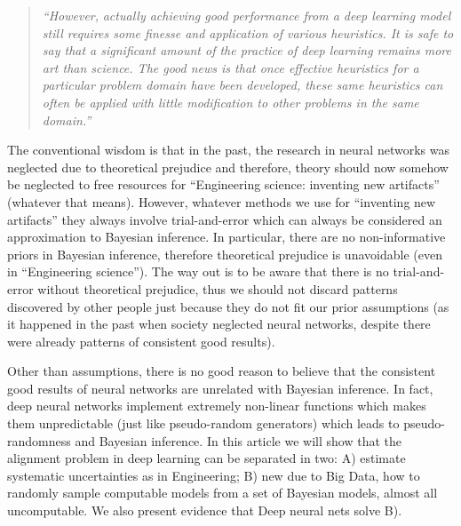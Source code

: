 \documentclass[11pt]{book}
\begin{document}
\begin{quote}
\emph{``However,} \emph{actually achieving good performance from a deep
learning model still requires some finesse and application of various
heuristics. It is safe to say that a significant amount of the practice
of deep learning remains more art than science. The good news is that
once effective heuristics for a particular problem domain have been
developed, these same heuristics can often be applied with little
modification to other problems in the same
domain.''}\cite{hermann_ab_2023}
\end{quote}

The conventional wisdom is that in the past, the research in neural
networks was neglected due to theoretical
prejudice\cite{lecun_epistemology_2019}
and therefore, theory should now somehow be neglected to free resources
for ``Engineering science: inventing new artifacts'' (whatever that
means). However, whatever methods we use for ``inventing new artifacts''
they always involve trial-and-error which can always be considered an
approximation to Bayesian inference. In particular, there are no
non-informative priors in Bayesian
inference\cite{eaton_dutch_2004}, therefore theoretical prejudice is unavoidable (even in
``Engineering science''). The way out is to be aware that there is no
trial-and-error without theoretical prejudice, thus we should not
discard patterns discovered by other people just because they do not fit
our prior assumptions (as it happened in the past when society neglected
neural networks, despite there were already patterns of consistent good
results).

Other than assumptions, there is no good reason to believe that the
consistent good results of neural networks are unrelated with Bayesian
inference. In fact, deep neural networks implement extremely non-linear
functions which makes them unpredictable (just like pseudo-random
generators) which leads to pseudo-randomness and Bayesian inference. In
this article we will show that the alignment
problem\cite{ngo_alignment_2022}\cite{wolf_fundamental_2023} in deep learning can be
separated in two: A) estimate systematic
uncertainties\cite{hullermeier_aleatoric_2021} as in Engineering; B) new due to Big Data, how to
randomly sample computable models from a set of Bayesian models, almost
all uncomputable. We also present evidence that Deep neural nets solve
B).
\end{document}

